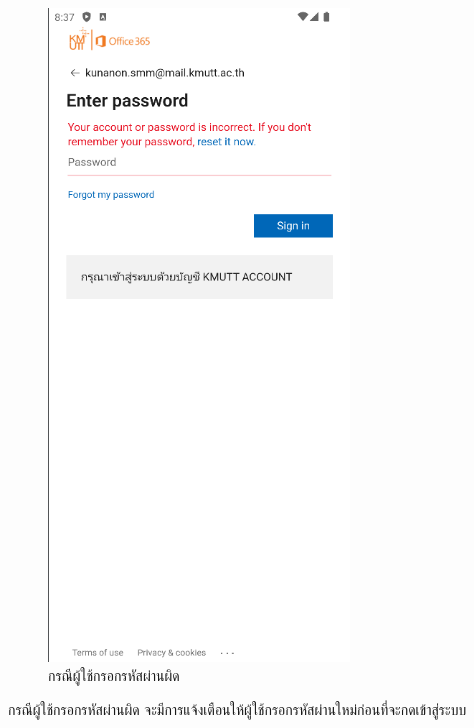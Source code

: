 \documentclass[14pt,oneside,openright,a4paper]{cpe-thai-project}
\begin{document}
\begin{figure}[!h]\centering
  \includegraphics[width=8cm]{./Pictures/Scene4.png}
  \caption{กรณีผู้ใช้กรอกรหัสผ่านผิด}\label{fig:PasswordWrongTest}
\end{figure}
  \hspace*{1cm} กรณีผู้ใช้กรอกรหัสผ่านผิด จะมีการแจ้งเตือนให้ผู้ใช้กรอกรหัสผ่านใหม่ก่อนที่จะกดเข้าสู่ระบบ

\newpage
\end{document}
